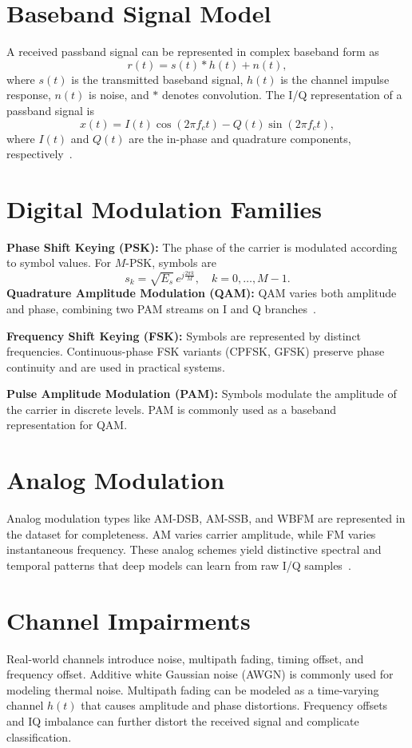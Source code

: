 \documentclass[12pt,a4paper]{report}
\begin{document}
\section{Baseband Signal Model}
A received passband signal can be represented in complex baseband form as
\begin{equation}
    r(t) = s(t) * h(t) + n(t),
\end{equation}
where $s(t)$ is the transmitted baseband signal, $h(t)$ is the channel impulse response, $n(t)$ is noise, and $*$ denotes convolution. The I/Q representation of a passband signal is
\begin{equation}
    x(t) = I(t)\cos(2\pi f_c t) - Q(t)\sin(2\pi f_c t),
\end{equation}
where $I(t)$ and $Q(t)$ are the in-phase and quadrature components, respectively~\cite{proakis2001digital}.

\section{Digital Modulation Families}
\textbf{Phase Shift Keying (PSK):} The phase of the carrier is modulated according to symbol values. For $M$-PSK, symbols are
\begin{equation}
    s_k = \sqrt{E_s}\,e^{j\frac{2\pi k}{M}}, \quad k=0,\dots,M-1.
\end{equation}
\textbf{Quadrature Amplitude Modulation (QAM):} QAM varies both amplitude and phase, combining two PAM streams on I and Q branches~\cite{sklar2001digital}.

\textbf{Frequency Shift Keying (FSK):} Symbols are represented by distinct frequencies. Continuous-phase FSK variants (CPFSK, GFSK) preserve phase continuity and are used in practical systems.

\textbf{Pulse Amplitude Modulation (PAM):} Symbols modulate the amplitude of the carrier in discrete levels. PAM is commonly used as a baseband representation for QAM.

\section{Analog Modulation}
Analog modulation types like AM-DSB, AM-SSB, and WBFM are represented in the dataset for completeness. AM varies carrier amplitude, while FM varies instantaneous frequency. These analog schemes yield distinctive spectral and temporal patterns that deep models can learn from raw I/Q samples~\cite{proakis2001digital}.

\section{Channel Impairments}
Real-world channels introduce noise, multipath fading, timing offset, and frequency offset. Additive white Gaussian noise (AWGN) is commonly used for modeling thermal noise. Multipath fading can be modeled as a time-varying channel $h(t)$ that causes amplitude and phase distortions. Frequency offsets and IQ imbalance can further distort the received signal and complicate classification.
\end{document}
